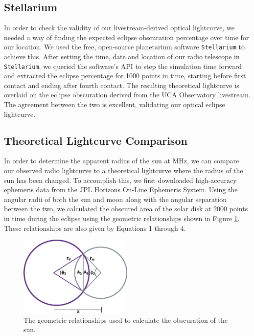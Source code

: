 \subsection{\label{sec:stellarium}Stellarium}

In order to check the validity of our livestream-derived optical lightcurve, we needed a way of finding the expected eclipse obscuration percentage over time for our location.
We used the free, open-source planetarium software \texttt{Stellarium} to achieve this.
After setting the time, date and location of our radio telescope in \texttt{Stellarium}, we queried the software's API to step the simulation time forward and extracted the eclipse percentage for 1000 points in time, starting before first contact and ending after fourth contact.
The resulting theoretical lightcurve is overlaid on the eclipse obscuration derived from the UCA Observatory livestream.
The agreement between the two is excellent, validating our optical eclipse lightcurve.

\subsection{\label{sec:theoreticalLightcurves}Theoretical Lightcurve Comparison}

In order to determine the apparent radius of the sun at \unit[1420]{MHz}, we can compare our observed radio lightcurve to a theoretical lightcurve where the radius of the sun has been changed.
To accomplish this, we first downloaded high-accuracy ephemeris data from the JPL Horizons On-Line Ephemeris System. 
Using the angular radii of both the sun and moon along with the angular separation between the two, we calculated the obscured area of the solar disk at 2000 points in time during the eclipse using the geometric relationships shown in Figure \ref{fig:eclipse_geometry}.
These relationships are also given by Equations 1 through 4.

\begin{figure}
  \includegraphics[width=0.5\textwidth]{figures/drawing}
  \caption{\label{fig:eclipse_geometry} The geometric relationships used to calculate the obscuration of the sun.}
\end{figure}

